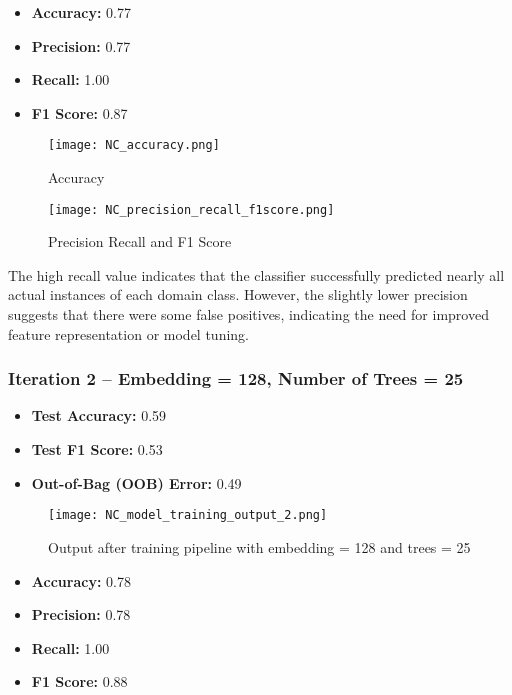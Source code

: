 \documentclass[conference, 12pt]{IEEEtran}
\begin{document}
\begin{itemize}
  \item \textbf{Accuracy:} 0.77
  \item \textbf{Precision:} 0.77
  \item \textbf{Recall:} 1.00
  \item \textbf{F1 Score:} 0.87
\end{itemize}

\begin{figure}[h]
    \centering
    \texttt{[image: NC\_accuracy.png]} %
    \caption{Accuracy}
    \label{fig:accuracy}
\end{figure}

\begin{figure}[h]
    \centering
    \texttt{[image: NC\_precision\_recall\_f1score.png]} %
    \caption{Precision Recall and F1 Score}
    \label{fig:NC_Precision_Recall}
\end{figure}

The high recall value indicates that the classifier successfully predicted nearly all actual instances of each domain class. However, the slightly lower precision suggests that there were some false positives, indicating the need for improved feature representation or model tuning.

\subsubsection{Iteration 2 -- Embedding = 128, Number of Trees = 25}

\begin{itemize}
  \item \textbf{Test Accuracy:} 0.59
  \item \textbf{Test F1 Score:} 0.53
  \item \textbf{Out-of-Bag (OOB) Error:} 0.49
\end{itemize}

\begin{figure}[h]
  \centering
  \texttt{[image: NC\_model\_training\_output\_2.png]} 
  \caption{Output after training pipeline with embedding = 128 and trees = 25}
  \label{fig:classification_metrics_2}
\end{figure}

\begin{itemize}
  \item \textbf{Accuracy:} 0.78
  \item \textbf{Precision:} 0.78
  \item \textbf{Recall:} 1.00
  \item \textbf{F1 Score:} 0.88
\end{itemize}
\end{document}

